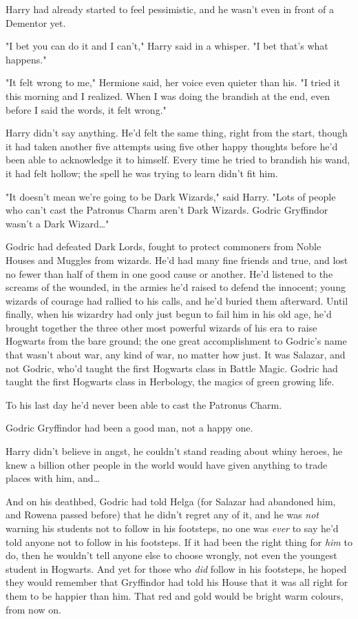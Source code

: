Harry had already started to feel pessimistic, and he wasn't even in front of a
Dementor yet.

"I bet you can do it and I can't," Harry said in a whisper. "I bet that's what
happens."

"It felt wrong to me," Hermione said, her voice even quieter than his. "I tried
it this morning and I realized. When I was doing the brandish at the end, even
before I said the words, it felt wrong."

Harry didn't say anything. He'd felt the same thing, right from the start,
though it had taken another five attempts using five other happy thoughts
before he'd been able to acknowledge it to himself. Every time he tried to
brandish his wand, it had felt hollow; the spell he was trying to learn didn't
fit him.

"It doesn't mean we're going to be Dark Wizards," said Harry. "Lots of people
who can't cast the Patronus Charm aren't Dark Wizards. Godric Gryffindor wasn't
a Dark Wizard{\ldots}"

Godric had defeated Dark Lords, fought to protect commoners from Noble Houses
and Muggles from wizards. He'd had many fine friends and true, and lost no fewer
than half of them in one good cause or another. He'd listened to the screams of
the wounded, in the armies he'd raised to defend the innocent; young wizards of
courage had rallied to his calls, and he'd buried them afterward. Until
finally, when his wizardry had only just begun to fail him in his old age, he'd
brought together the three other most powerful wizards of his era to raise
Hogwarts from the bare ground; the one great accomplishment to Godric's name
that wasn't about war, any kind of war, no matter how just. It was Salazar, and
not Godric, who'd taught the first Hogwarts class in Battle Magic. Godric had
taught the first Hogwarts class in Herbology, the magics of green growing life.

To his last day he'd never been able to cast the Patronus Charm.

Godric Gryffindor had been a good man, not a happy one.

Harry didn't believe in angst, he couldn't stand reading about whiny heroes, he
knew a billion other people in the world would have given anything to trade
places with him, and{\ldots}

And on his deathbed, Godric had told Helga (for Salazar had abandoned him, and
Rowena passed before) that he didn't regret any of it, and he was \emph{not}
warning his students not to follow in his footsteps, no one was \emph{ever} to
say he'd told anyone not to follow in his footsteps. If it had been the right
thing for \emph{him} to do, then he wouldn't tell anyone else to choose
wrongly, not even the youngest student in Hogwarts. And yet for those who
\emph{did} follow in his footsteps, he hoped they would remember that
Gryffindor had told his House that it was all right for them to be happier than
him. That red and gold would be bright warm colours, from now on.

